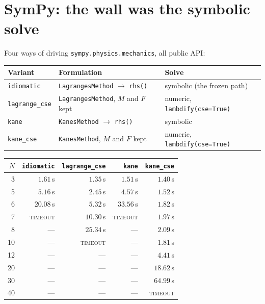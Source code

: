 \documentclass[11pt,a4paper]{article}
\newcommand{\code}[1]{\texttt{\small #1}}
\begin{document}
\section{SymPy: the wall was the symbolic solve}

Four ways of driving \code{sympy.physics.mechanics}, all public API:

\begin{center}
\begin{tabular}{@{}lL{0.34\textwidth}L{0.30\textwidth}@{}}
\toprule
\textbf{Variant} & \textbf{Formulation} & \textbf{Solve} \\
\midrule
\code{idiomatic}    & \code{LagrangesMethod} $\to$ \code{rhs()} & symbolic (the frozen path) \\
\code{lagrange\_cse}& \code{LagrangesMethod}, $M$ and $F$ kept  & numeric, \code{lambdify(cse=True)} \\
\code{kane}         & \code{KanesMethod} $\to$ \code{rhs()}     & symbolic \\
\code{kane\_cse}    & \code{KanesMethod}, $M$ and $F$ kept      & numeric, \code{lambdify(cse=True)} \\
\bottomrule
\end{tabular}
\end{center}

\begin{center}
\begin{tabular}{@{}rrrrr@{}}
\toprule
$N$ & \code{idiomatic} & \code{lagrange\_cse} & \code{kane} & \code{kane\_cse} \\
\midrule
 3 &   $1.61$\,s &  $1.35$\,s &   $1.51$\,s &   $1.40$\,s \\
 5 &   $5.16$\,s &  $2.45$\,s &   $4.57$\,s &   $1.52$\,s \\
 6 &  $20.08$\,s &  $5.32$\,s &  $33.56$\,s &   $1.82$\,s \\
 7 & \textsc{timeout} & $10.30$\,s & \textsc{timeout} & $1.97$\,s \\
 8 &  ---        & $25.34$\,s &  ---        &   $2.09$\,s \\
10 &  ---        & \textsc{timeout} & --- &   $1.81$\,s \\
12 &  ---        & ---        &  ---        &   $4.41$\,s \\
20 &  ---        & ---        &  ---        &  $18.62$\,s \\
30 &  ---        & ---        &  ---        &  $64.99$\,s \\
40 &  ---        & ---        &  ---        & \textsc{timeout} \\
\bottomrule
\end{tabular}
\end{center}
\end{document}
